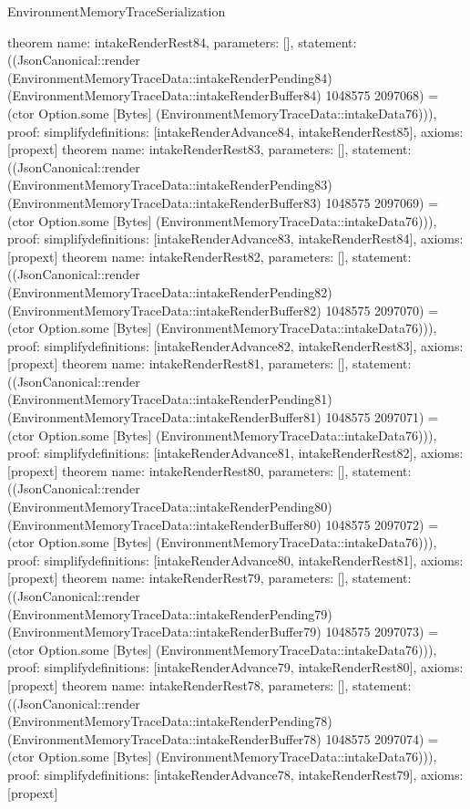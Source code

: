 \begin{lexlean}{EnvironmentMemoryTraceSerialization}
\begin{semanticmodule}
{}
theorem{
 name: intakeRenderRest84, parameters: [],
 statement: ((JsonCanonical::render (EnvironmentMemoryTraceData::intakeRenderPending84) (EnvironmentMemoryTraceData::intakeRenderBuffer84) 1048575 2097068) = (ctor Option.some [Bytes] (EnvironmentMemoryTraceData::intakeData76))), proof: simplify{definitions: [intakeRenderAdvance84, intakeRenderRest85]}, axioms: [propext]
}
theorem{
 name: intakeRenderRest83, parameters: [],
 statement: ((JsonCanonical::render (EnvironmentMemoryTraceData::intakeRenderPending83) (EnvironmentMemoryTraceData::intakeRenderBuffer83) 1048575 2097069) = (ctor Option.some [Bytes] (EnvironmentMemoryTraceData::intakeData76))), proof: simplify{definitions: [intakeRenderAdvance83, intakeRenderRest84]}, axioms: [propext]
}
theorem{
 name: intakeRenderRest82, parameters: [],
 statement: ((JsonCanonical::render (EnvironmentMemoryTraceData::intakeRenderPending82) (EnvironmentMemoryTraceData::intakeRenderBuffer82) 1048575 2097070) = (ctor Option.some [Bytes] (EnvironmentMemoryTraceData::intakeData76))), proof: simplify{definitions: [intakeRenderAdvance82, intakeRenderRest83]}, axioms: [propext]
}
theorem{
 name: intakeRenderRest81, parameters: [],
 statement: ((JsonCanonical::render (EnvironmentMemoryTraceData::intakeRenderPending81) (EnvironmentMemoryTraceData::intakeRenderBuffer81) 1048575 2097071) = (ctor Option.some [Bytes] (EnvironmentMemoryTraceData::intakeData76))), proof: simplify{definitions: [intakeRenderAdvance81, intakeRenderRest82]}, axioms: [propext]
}
theorem{
 name: intakeRenderRest80, parameters: [],
 statement: ((JsonCanonical::render (EnvironmentMemoryTraceData::intakeRenderPending80) (EnvironmentMemoryTraceData::intakeRenderBuffer80) 1048575 2097072) = (ctor Option.some [Bytes] (EnvironmentMemoryTraceData::intakeData76))), proof: simplify{definitions: [intakeRenderAdvance80, intakeRenderRest81]}, axioms: [propext]
}
theorem{
 name: intakeRenderRest79, parameters: [],
 statement: ((JsonCanonical::render (EnvironmentMemoryTraceData::intakeRenderPending79) (EnvironmentMemoryTraceData::intakeRenderBuffer79) 1048575 2097073) = (ctor Option.some [Bytes] (EnvironmentMemoryTraceData::intakeData76))), proof: simplify{definitions: [intakeRenderAdvance79, intakeRenderRest80]}, axioms: [propext]
}
theorem{
 name: intakeRenderRest78, parameters: [],
 statement: ((JsonCanonical::render (EnvironmentMemoryTraceData::intakeRenderPending78) (EnvironmentMemoryTraceData::intakeRenderBuffer78) 1048575 2097074) = (ctor Option.some [Bytes] (EnvironmentMemoryTraceData::intakeData76))), proof: simplify{definitions: [intakeRenderAdvance78, intakeRenderRest79]}, axioms: [propext]
}
\end{semanticmodule}
\end{lexlean}
